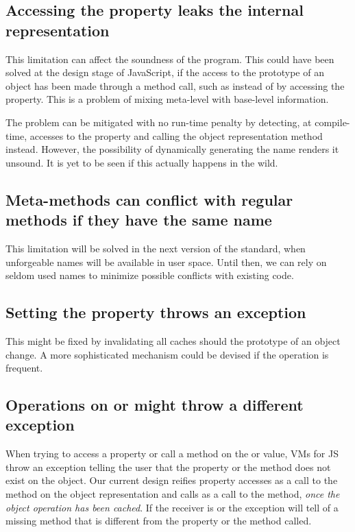 \subsection{Accessing the  property leaks the internal representation}

This limitation can affect the soundness of the program. This could have been
solved at the design stage of JavaScript, if the access to the prototype of an
object has been made through a method call, such as  instead
of by accessing the  property. This is a problem of mixing
meta-level with base-level information.

The problem can be mitigated with no run-time penalty by detecting, at
compile-time, accesses to the  property and calling the object
representation  method instead. However, the possibility of
dynamically generating the  name renders it unsound. It
is yet to be seen if this actually happens in the wild.

\subsection{Meta-methods can conflict with regular methods if they have the same name}

This limitation will be solved in the next version of the standard, when
unforgeable names will be available in user space.  Until then, we can rely on
seldom used names to minimize possible conflicts with existing code.

\subsection{Setting the  property throws an exception}

This might be fixed by invalidating all caches should the prototype of an
object change. A more sophisticated mechanism could be devised if the operation
is frequent.

\subsection{Operations on  or  might throw a different exception}

When trying to access a property or call a method on the  or
 value, VMs for JS throw an exception telling the user that the
property or the method does not exist on the object. Our current design reifies
property accesses as a call to the  method on the object representation
and calls as a call to the  method, \textit{once the object operation
has been cached}. If the receiver is  or  the exception
will tell of a missing method that is different from the property or the method
called.

